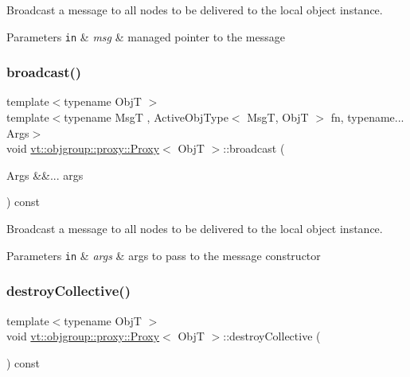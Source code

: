 Broadcast a message to all nodes to be delivered to the local object instance. 


\begin{DoxyParams}[1]{Parameters}
\mbox{\tt in}  & {\em msg} & managed pointer to the message \\
\hline
\end{DoxyParams}
\mbox{\label{structvt_1_1objgroup_1_1proxy_1_1_proxy_ad4f1ddeb5b09f01643b17a93bbbe82e9}} 
\subsubsection{\texorpdfstring{broadcast()}{broadcast()}\hspace{0.1cm}{\footnotesize\ttfamily [3/3]}}
{\footnotesize\ttfamily template$<$typename ObjT $>$ \\
template$<$typename MsgT , Active\+Obj\+Type$<$ Msg\+T, Obj\+T $>$ fn, typename... Args$>$ \\
void \hyperlink{structvt_1_1objgroup_1_1proxy_1_1_proxy}{vt\+::objgroup\+::proxy\+::\+Proxy}$<$ ObjT $>$\+::broadcast (\begin{DoxyParamCaption}\item[{Args \&\&...}]{args }\end{DoxyParamCaption}) const}



Broadcast a message to all nodes to be delivered to the local object instance. 


\begin{DoxyParams}[1]{Parameters}
\mbox{\tt in}  & {\em args} & args to pass to the message constructor \\
\hline
\end{DoxyParams}
\mbox{\label{structvt_1_1objgroup_1_1proxy_1_1_proxy_a6758c7979d1f69722449cb78f998cbf1}} 
\subsubsection{\texorpdfstring{destroy\+Collective()}{destroyCollective()}}
{\footnotesize\ttfamily template$<$typename ObjT $>$ \\
void \hyperlink{structvt_1_1objgroup_1_1proxy_1_1_proxy}{vt\+::objgroup\+::proxy\+::\+Proxy}$<$ ObjT $>$\+::destroy\+Collective (\begin{DoxyParamCaption}{ }\end{DoxyParamCaption}) const}



